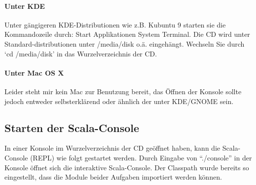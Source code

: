 \documentclass[a4paper,11pt]{scrartcl}
\begin{document}
\paragraph{Unter KDE}
Unter gängigeren KDE-Distributionen wie z.B. Kubuntu 9 starten sie die Kommandozeile durch:
Start \then Applikationen \then System \then Terminal.
Die CD wird unter Standard-distributionen unter /media/disk o.ä. eingehängt. Wechseln Sie durch `cd /media/disk' in das Wurzelverzeichnis der CD.
\paragraph{Unter Mac OS X}
Leider steht mir kein Mac zur Benutzung bereit, das Öffnen der Konsole sollte jedoch entweder selbsterklärend oder ähnlich der unter KDE/GNOME sein.
\subsection{Starten der Scala-Console}
In einer Konsole im Wurzelverzeichnis der CD geöffnet haben, kann die Scala-Console (REPL) wie folgt gestartet werden.
Durch Eingabe von ``./console'' in der Konsole öffnet sich die interaktive Scala-Console.
Der Classpath wurde bereits so eingestellt, dass die Module beider Aufgaben importiert werden können.




\end{document}
